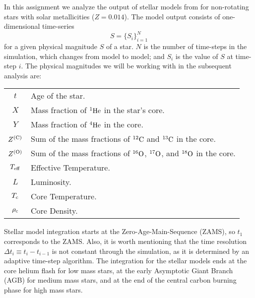 In this assignment we analyze the output of stellar models from \citep{ekstrom2012grids} for non-rotating stars with solar metallicities ($Z=0.014$).
The model output consists of one-dimensional time-series
\begin{equation}
    S = \{ S_i \}_{i=1}^N
\end{equation}
for a given physical magnitude $S$ of a star. $N$ is the number of time-steps in the simulation, which changes from model to model; and $S_i$ is the value of $S$ at time-step $i$. The physical magnitudes we will be working with in the subsequent analysis are:
\begin{table}[h]
    \centering
    \begin{tabular}{c p{5cm}}
        \( t \)                        & Age of the star.                                                                                         \\
        \( X \)                        & Mass fraction of \( ^1{\rm He} \) in the star's core.                                                    \\
        \( Y \)                        & Mass fraction of \( ^4{\rm He} \) in the core.                                                           \\
        \( Z^{\left({\rm C}\right)} \) & Sum of the mass fractions of \( ^{12}{\rm C} \) and \( ^{13}{\rm C} \) in the core.                      \\
        \( Z^{\left({\rm O}\right)} \) & Sum of the mass fractions of \( ^{16}{\rm O} \), \( ^{17}{\rm O} \), and \( ^{18}{\rm O} \) in the core. \\
        \( T_{\rm eff} \)              & Effective Temperature.                                                                                   \\
        \( L \)                        & Luminosity.                                                                                              \\
        \( T_{\rm c} \)                & Core Temperature.                                                                                        \\
        \( \rho_{\rm c} \)             & Core Density.                                                                                            \\
    \end{tabular}
    \label{tab:parameters}
\end{table}

Stellar model integration starts at the Zero-Age-Main-Sequence (ZAMS), so \( t_1 \) corresponds to the ZAMS. Also, it is worth mentioning that the time resolution
\(\Delta t_i \equiv t_i - t_{i-1} \)
is not constant through the simulation, as it is determined by an adaptive time-step algorithm. The integration for the stellar models ends at the core helium flash for low mass stars, at the early Asymptotic Giant Branch (AGB) for medium mass stars, and at the end of the central carbon burning phase for high mass stars.